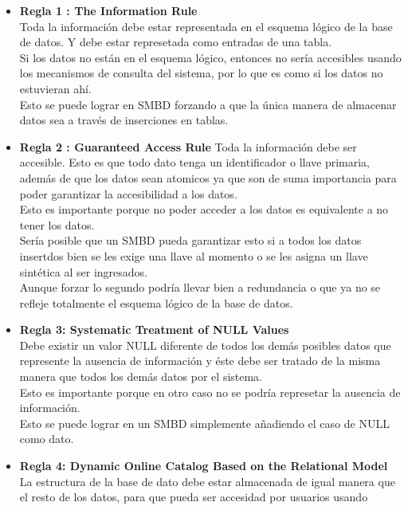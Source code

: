 \documentclass{article}
\begin{document}
    \begin{itemize}
    	\item\textbf{Regla 1 : The Information Rule}\\
        Toda la información debe estar representada en el esquema lógico de la 
        base de datos. Y debe estar represetada como entradas de una tabla.\\
        Si los datos no están en el esquema lógico, entonces no sería accesibles
        usando los mecanismos de consulta del sistema, por lo que es como si 
        los datos no estuvieran ahí.\\
        Esto se puede lograr en SMBD forzando a que la única manera de almacenar 
        datos sea a través de inserciones en tablas.
    	\item\textbf{Regla 2 : Guaranteed Access Rule}
        Toda la información debe ser accesible. Esto es que todo dato tenga un 
        identificador o llave primaria, además de  que los datos sean atomicos 
        ya que son de suma importancia para poder garantizar la accesibilidad a 
        los datos.\\
        Esto es importante porque no poder acceder a los datos es equivalente a
        no tener los datos. \\
        Sería posible que un SMBD pueda garantizar esto si a todos los datos 
        insertdos bien se les exige una llave al momento o se les asigna un 
        llave sintética al ser ingresados.\\
        Aunque forzar lo segundo podría llevar bien a redundancia o que ya no 
        se refleje totalmente el esquema lógico de la base de datos.
    	\item\textbf{Regla 3: Systematic Treatment of NULL Values}\\
        Debe existir un valor NULL diferente de todos los demás posibles datos 
        que represente la ausencia de información y éste debe ser tratado de la 
        misma manera que todos los demás datos por el sistema.\\
        Esto es importante porque en otro caso no se podría represetar la 
        ausencia de información.\\
        Esto se puede lograr en un SMBD simplemente añadiendo el caso de NULL 
        como dato.
    	\item\textbf{Regla 4: Dynamic Online Catalog Based on the Relational Model}\\
        La estructura de la base de dato debe estar almacenada de igual manera 
        que el resto de los datos, para que pueda ser accesidad por usuarios usando

\end{itemize}
\end{document}
